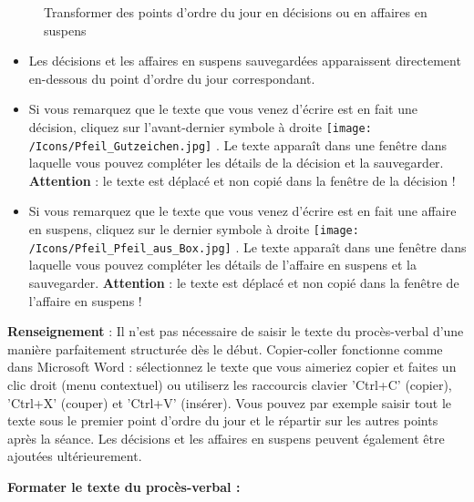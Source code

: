 \begin{figure}[H]
\caption{Transformer des points d'ordre du jour en décisions ou en affaires en suspens}
\end{figure}

\begin{itemize}
\item
Les décisions et les affaires en suspens sauvegardées apparaissent directement en-dessous du point d'ordre du jour correspondant.
\item
Si vous remarquez que le texte que vous venez d'écrire est en fait une décision, cliquez sur l'avant-dernier symbole à droite \texttt{[image: /Icons/Pfeil\_Gutzeichen.jpg]} . Le texte apparaît dans une fenêtre dans laquelle vous pouvez compléter les détails de la décision et la sauvegarder. \textbf{Attention} : le texte est déplacé et non copié dans la fenêtre de la décision !
\item
Si vous remarquez que le texte que vous venez d'écrire est en fait une affaire en suspens, cliquez sur le dernier symbole à droite \texttt{[image: /Icons/Pfeil\_Pfeil\_aus\_Box.jpg]} . Le texte apparaît dans une fenêtre dans laquelle vous pouvez compléter les détails de l'affaire en suspens et la sauvegarder. \textbf{Attention} : le texte est déplacé et non copié dans la fenêtre de l'affaire en suspens !

\end{itemize}


\textbf{Renseignement} : Il n'est pas nécessaire de saisir le texte du procès-verbal d'une manière parfaitement structurée dès le début. Copier-coller fonctionne comme dans Microsoft Word : sélectionnez le texte que vous aimeriez copier et faites un clic droit (menu contextuel) ou utiliserz les raccourcis clavier 'Ctrl+C' (copier), 'Ctrl+X' (couper) et 'Ctrl+V' (insérer). Vous pouvez par exemple saisir tout le texte sous le premier point d'ordre du jour et le répartir sur les autres points après la séance. Les décisions et les affaires en suspens peuvent également être ajoutées ultérieurement.

\vspace{\baselineskip}

\textbf{Formater le texte du procès-verbal :}


